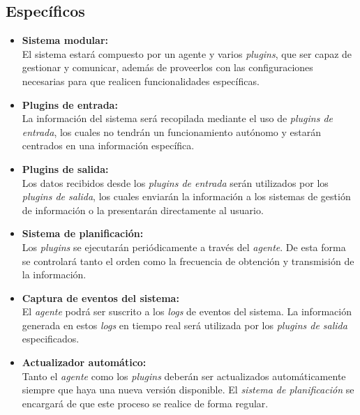     \subsection{Específicos}
        \begin{itemize}
            \item \textbf{Sistema modular:} \\
                El sistema estará compuesto por un agente y varios \textit{plugins}, que ser capaz de gestionar y comunicar, además de proveerlos con las configuraciones necesarias para que realicen funcionalidades específicas.
                
            \item \textbf{Plugins de entrada:} \\
                La información del sistema será recopilada mediante el uso de \textit{plugins de entrada}, los cuales no tendrán un funcionamiento autónomo y estarán centrados en una información específica.
                
            \item \textbf{Plugins de salida:} \\
                Los datos recibidos desde los \textit{plugins de entrada} serán utilizados por los \textit{plugins de salida}, los cuales enviarán la información a los sistemas de gestión de información o la presentarán directamente al usuario.
                
            \item \textbf{Sistema de planificación:} \\
                Los \textit{plugins} se ejecutarán periódicamente a través del \textit{agente}. De esta forma se controlará tanto el orden como la frecuencia de obtención y transmisión de la información.
                  
            \item \textbf{Captura de eventos del sistema:} \\
                El \textit{agente} podrá ser suscrito a los \textit{logs} de eventos del sistema. La información generada en estos \textit{logs} en tiempo real será utilizada por los \textit{plugins de salida} especificados.
            
            \item \textbf{Actualizador automático:} \\
                Tanto el \textit{agente} como los \textit{plugins} deberán ser actualizados automáticamente siempre que haya una nueva versión disponible. El \textit{sistema de planificación} se encargará de que este proceso se realice de forma regular.
                

\end{itemize}
